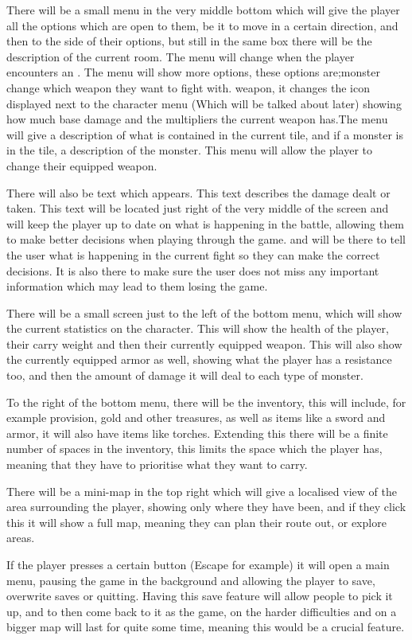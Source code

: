 \documentclass[12pt]{article}
\begin{document}
There will be a small menu in the very middle bottom which will give the player all the options which are open to them, be it to move in a certain direction, and then to the side of their options, but still in the same box there will be the description of the current room. The menu will change when the player encounters an . The menu will show more options, these options are;monster change which weapon they want to fight with. weapon, it changes the icon displayed next to the character menu (Which will be talked about later) showing how much base damage and the multipliers the current weapon has.The menu will give a description of what is contained in the current tile, and if a monster is in the tile, a description of the monster. This menu will allow the player to change their equipped weapon. 

There will also be text which appears. This text describes the damage dealt or taken. This text will be located just right of the very middle of the screen and will keep the player up to date on what is happening in the battle, allowing them to make better decisions when playing through the game. and will be there to tell the user what is happening in the current fight so they can make the correct decisions. It is also there to make sure the user does not miss any important information which may lead to them losing the game. 

There will be a small screen just to the left of the bottom menu, which will show the current statistics on the character. This will show the health of the player, their carry weight and then their currently equipped weapon. This will also show the currently equipped armor as well, showing what the player has a resistance too, and then the amount of damage it will deal to each type of monster.  

To the right of the bottom menu, there will be the inventory, this will include, for example provision, gold and other treasures, as well as items like a sword and armor, it will also have items like torches. Extending this there will be a finite number of spaces in the inventory, this limits the space which the player has, meaning that they have to prioritise what they want to carry.

There will be a mini-map in the top right which will give a localised view of the area surrounding the player, showing only where they have been, and if they click this it will show a full map, meaning they can plan their route out, or explore areas. 

If the player presses a certain button (Escape for example) it will open a main menu, pausing the game in the background and allowing the player to save, overwrite saves or quitting. Having this save feature will allow people to pick it up, and to then come back to it as the game, on the harder difficulties and on a bigger map will last for quite some time, meaning this would be a crucial feature.
\end{document}
